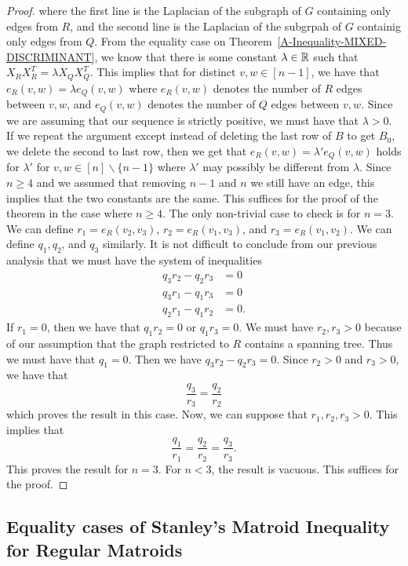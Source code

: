 \documentclass{puthesis-UG}
\begin{document}
\begin{proof}
	where the first line is the Laplacian of the subgraph of $G$ containing only edges from $R$, and the second line is the Laplacian of the subgrpah of $G$ containig only edges from $Q$. From the equality case on Theorem~\ref{A-Inequality-MIXED-DISCRIMINANT}, we know that there is some constant $\lambda \in \mathbb{R}$ such that $X_RX_R^T = \lambda X_QX_Q^T$. This implies that for distinct $v, w \in [n-1]$, we have that $e_R(v, w) = \lambda e_Q(v, w)$ where $e_R(v, w)$ denotes the number of $R$ edges between $v, w$, and $e_Q(v, w)$ denotes the number of $Q$ edges between $v, w$. Since we are assuming that our sequence is strictly positive, we must have that $\lambda > 0$. If we repeat the argument except instead of deleting the last row of $B$ to get $B_0$, we delete the second to last row, then we get that $e_R(v, w) = \lambda' e_Q(v, w)$ holds for $\lambda'$ for $v, w \in [n] \backslash \{n-1\}$ where $\lambda'$ may possibly be different from $\lambda$. Since $n \geq 4$ and we assumed that removing $n-1$ and $n$ we still have an edge, this implies that the two constants are the same. This suffices for the proof of the theorem in the case where $n \geq 4$. The only non-trivial case to check is for $n = 3$. We can define $r_1 = e_R(v_2, v_3)$, $r_2 = e_R(v_1, v_3)$, and $r_3 = e_R(v_1, v_2)$. We can define $q_1, q_2$, and $q_3$ similarly. It is not difficult to conclude from our previous analysis that we must have the system of inequalities
	\begin{align*}
		q_3 r_2 - q_2 r_3 & = 0 \\
		q_3 r_1 - q_1 r_3 & = 0 \\
		q_2 r_1 - q_1 r_2 & = 0.
	\end{align*}
	If $r_1 = 0$, then we have that $q_1 r_2 = 0$ or $q_1 r_3 = 0$. We must have $r_2, r_3 > 0$ because of our assumption that the graph restricted to $R$ contains a spanning tree. Thus we must have that $q_1 = 0$. Then we have $q_3 r_2 - q_2 r_3 = 0$. Since $r_2 > 0$ and $r_3 > 0$, we have that 
	\[
		\frac{q_3}{r_3} = \frac{q_2}{r_2}
	\]
	which proves the result in this case. Now, we can suppose that $r_1, r_2, r_3 > 0$. This implies that 
	\[
		\frac{q_1}{r_1} = \frac{q_2}{r_2} = \frac{q_3}{r_3}.
	\]
	This proves the result for $n = 3$. For $n < 3$, the result is vacuous. This suffices for the proof. 

\end{proof}

\subsection{Equality cases of Stanley's Matroid Inequality for Regular Matroids}
\end{document}
